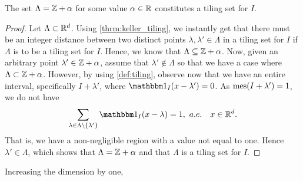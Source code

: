 \documentclass[../thesis.tex]{subfiles}
\begin{document}
\begin{lemma}\label{lem:tiling_unit_1d}
    The set $\Lambda = \mathbb{Z} +\alpha$ for some value $\alpha\in \mathbb{R}$ constitutes a tiling set for $I$.
\end{lemma}

\begin{proof}  %
    Let $\Lambda \subset \mathbb{R}^d$. Using \cref{thrm:keller_tiling}, we instantly get that there must be an integer distance between two distinct points $\lambda,\lambda' \in \Lambda$ in a tiling set for $I$ \SigridChange{/} if $\Lambda$ is to be a tiling set for $I$. Hence, we know that $\Lambda \subseteq \mathbb{Z} +\alpha$. Now, given an arbitrary point $\lambda' \in \mathbb{Z} +\alpha$, assume that $\lambda'\notin \Lambda$ so that we have a case where $\Lambda \subset \mathbb{Z}+\alpha$. However, by using \cref{def:tiling}, observe now that we have an entire interval, specifically $I+\lambda'$, where $\indicator{I}{x - \lambda'} = 0$. As $\operatorname{mes}(I+\lambda') = 1 $, we do not have
    \begin{equation*}
        \sum_{\lambda \in \Lambda\setminus \braq{\lambda'}} \indicator{I}{x-\lambda} = 1, \text{\space} a.e. \quad x \in \R^d.
    \end{equation*}
    That is, we have a non-negligible region with a value not equal to one. Hence $\lambda' \in \Lambda$, which shows that $\Lambda = \mathbb{Z}+\alpha$ and that $\Lambda$ is a tiling set for $I$. %
\end{proof}

Increasing the dimension by one,





\end{document}
